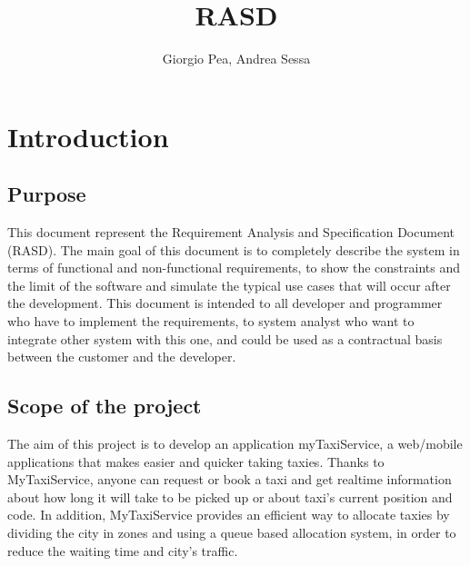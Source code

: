 \documentclass[11pt]{article} %
\title{RASD}
\author{Giorgio Pea, Andrea Sessa}
\begin{document}
\maketitle
\newpage

\tableofcontents

\newpage

\section{Introduction}
  \subsection{Purpose}
    This document represent the Requirement Analysis and Specification Document
    (RASD). The main goal of this document is to completely describe the system
    in terms of functional and non-functional requirements, to show the constraints and the limit
    of the software and simulate the typical use cases that will occur after the
    development. This document is intended to all developer and programmer who
    have to implement the requirements, to system analyst who want to integrate
    other system with this one, and could be used as a contractual basis between
    the customer and the developer.

  \subsection{Scope of the project}
    The aim of this project is to develop an application myTaxiService, a web/mobile applications that makes easier and quicker taking taxies.
    Thanks to MyTaxiService, anyone can request or book a taxi and get realtime information
    about how long it will take to be picked up or about taxi's current position and code.
    In addition, MyTaxiService provides an efficient way to allocate taxies by dividing the
    city in zones and using a queue based allocation system, in order to reduce the
    waiting time and city's traffic.
\end{document}
